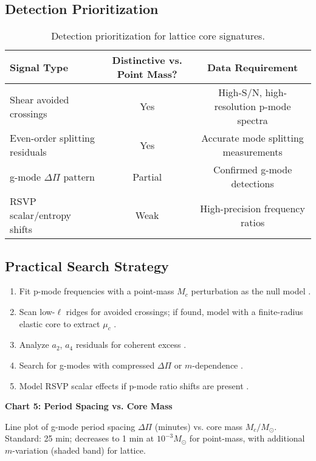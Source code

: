 \documentclass{article}
\begin{document}
\subsection{Detection Prioritization}

\begin{table}
\centering
\begin{tabular}{lcc}
\toprule
Signal Type & Distinctive vs. Point Mass? & Data Requirement \\
\midrule
Shear avoided crossings & Yes & High-S/N, high-resolution p-mode spectra \\
Even-order splitting residuals & Yes & Accurate mode splitting measurements \\
g-mode $\Delta \Pi$ pattern & Partial & Confirmed g-mode detections \\
RSVP scalar/entropy shifts & Weak & High-precision frequency ratios \\
\bottomrule
\end{tabular}
\caption{Detection prioritization for lattice core signatures.}
\end{table}

\subsection{Practical Search Strategy}

\begin{enumerate}
\item Fit p-mode frequencies with a point-mass $M_c$ perturbation as the null model \citep{bellinger2025}.
\item Scan low-$\ell$ ridges for avoided crossings; if found, model with a finite-radius elastic core to extract $\mu_c$ \citep{aerts2010}.
\item Analyze $a_2$, $a_4$ residuals for coherent excess \citep{lund2017}.
\item Search for g-modes with compressed $\Delta \Pi$ or $m$-dependence \citep{bellinger2025}.
\item Model RSVP scalar effects if p-mode ratio shifts are present \citep{kunitomo2022}.
\end{enumerate}

\textbf{Chart 5: Period Spacing vs. Core Mass}

Line plot of g-mode period spacing $\Delta \Pi$ (minutes) vs. core mass $M_c / M_\odot$. Standard: 25 min; decreases to 1 min at $10^{-3} M_\odot$ for point-mass, with additional $m$-variation (shaded band) for lattice.
\end{document}
